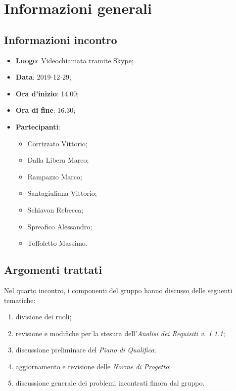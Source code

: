 \section{Informazioni generali}
    \subsection{Informazioni incontro}
        \begin{itemize}
            \item \textbf{Luogo}: Videochiamata tramite Skype;
            \item \textbf{Data}: 2019-12-29;
            \item \textbf{Ora d'inizio}: 14.00;
            \item \textbf{Ora di fine}: 16.30;
            \item \textbf{Partecipanti}: 
            \begin{itemize}
                \item Corrizzato Vittorio;
                \item Dalla Libera Marco;
                \item Rampazzo Marco;
                \item Santagiuliana Vittorio;
                \item Schiavon Rebecca;
                \item Spreafico Alessandro;
                \item Toffoletto Massimo.
            \end{itemize}
        \end{itemize}
    \subsection{Argomenti trattati}
        Nel quarto incontro, i componenti del gruppo hanno discusso delle seguenti tematiche:
        \begin{enumerate}
        	\item divisione dei ruoli;
        	\item revisione e modifiche per la stesura dell'\textit{Analisi dei Requisiti v. 1.1.1};
            \item discussione preliminare del \textit{Piano di Qualifica};
            \item aggiornamento e revisione delle \textit{Norme di Progetto};
            \item discussione generale dei problemi incontrati finora dal gruppo.
        \end{enumerate}
